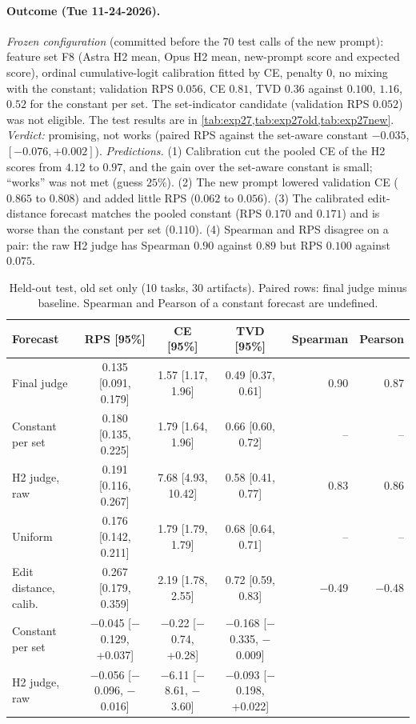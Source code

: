 \paragraph{Outcome (Tue 11-24-2026).}
\emph{Frozen configuration} (committed before the 70 test calls of the new prompt): feature set F8 (Astra H2 mean, Opus H2 mean, new-prompt score and expected score), ordinal cumulative-logit calibration fitted by CE, penalty $0$, no mixing with the constant; validation RPS $0.056$, CE $0.81$, TVD $0.36$ against $0.100$, $1.16$, $0.52$ for the constant per set. The set-indicator candidate (validation RPS $0.052$) was not eligible. The test results are in \cref{tab:exp27,tab:exp27old,tab:exp27new}.
\emph{Verdict:} promising, not works (paired RPS against the set-aware constant $-0.035$, $[-0.076,+0.002]$).
\emph{Predictions.} (1) Calibration cut the pooled CE of the H2 scores from $4.12$ to $0.97$, and the gain over the set-aware constant is small; ``works'' was not met (guess $25\%$). (2) The new prompt lowered validation CE ($0.865$ to $0.808$) and added little RPS ($0.062$ to $0.056$). (3) The calibrated edit-distance forecast matches the pooled constant (RPS $0.170$ and $0.171$) and is worse than the constant per set ($0.110$). (4) Spearman and RPS disagree on a pair: the raw H2 judge has Spearman $0.90$ against $0.89$ but RPS $0.100$ against $0.075$.

\begin{table}[t]
\caption{Held-out test, old set only (10 tasks, 30 artifacts). Paired rows: final judge minus baseline. Spearman and Pearson of a constant forecast are undefined.}
\label{tab:exp27old}
\centering\footnotesize
\begin{tabular}{lcccrr}
\toprule
Forecast & RPS [95\%] & CE [95\%] & TVD [95\%] & Spearman & Pearson\\
\midrule
Final judge & 0.135 [0.091, 0.179] & 1.57 [1.17, 1.96] & 0.49 [0.37, 0.61] & 0.90 & 0.87\\
Constant per set & 0.180 [0.135, 0.225] & 1.79 [1.64, 1.96] & 0.66 [0.60, 0.72] & -- & --\\
H2 judge, raw & 0.191 [0.116, 0.267] & 7.68 [4.93, 10.42] & 0.58 [0.41, 0.77] & 0.83 & 0.86\\
Uniform & 0.176 [0.142, 0.211] & 1.79 [1.79, 1.79] & 0.68 [0.64, 0.71] & -- & --\\
Edit distance, calib. & 0.267 [0.179, 0.359] & 2.19 [1.78, 2.55] & 0.72 [0.59, 0.83] & $-$0.49 & $-$0.48\\
\midrule
Constant per set & $-$0.045 [$-$0.129, +0.037] & $-$0.22 [$-$0.74, +0.28] & $-$0.168 [$-$0.335, $-$0.009] & & \\
H2 judge, raw & $-$0.056 [$-$0.096, $-$0.016] & $-$6.11 [$-$8.61, $-$3.60] & $-$0.093 [$-$0.198, +0.022] & & \\
\bottomrule
\end{tabular}
\end{table}

